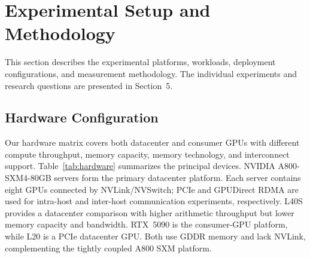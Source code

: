 \section{Experimental Setup and Methodology}
\label{sec:methodology}

This section describes the experimental platforms, workloads, deployment configurations, and measurement methodology. The individual experiments and research questions are presented in Section~5.

\subsection{Hardware Configuration}
\label{sec:hardware}

Our hardware matrix covers both datacenter and consumer GPUs with different compute throughput, memory capacity, memory technology, and interconnect support. Table~\ref{tab:hardware} summarizes the principal devices. NVIDIA A800-SXM4-80GB servers form the primary datacenter platform. Each server contains eight GPUs connected by NVLink/NVSwitch; PCIe and GPUDirect RDMA are used for intra-host and inter-host communication experiments, respectively. L40S provides a datacenter comparison with higher arithmetic throughput but lower memory capacity and bandwidth. RTX~5090 is the consumer-GPU platform, while L20 is a PCIe datacenter GPU. Both use GDDR memory and lack NVLink, complementing the tightly coupled A800 SXM platform.

\begin{table}[t]
  \caption{Principal GPU platforms. Compute values are dense peak TFLOPS without structured sparsity.}
  \label{tab:hardware}
  \centering
  \small
  \setlength{\tabcolsep}{2.5pt}
\end{table}

